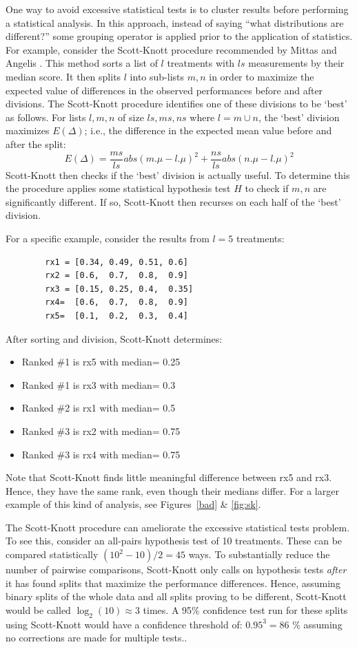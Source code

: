 \documentclass[preprint,10pt]{elsarticle}
\newcommand{\bi}{\begin{itemize}}
\newcommand{\ei}{\end{itemize}}
\begin{document}
One way to avoid excessive statistical tests is to cluster results before performing a statistical analysis. In this approach, instead of saying ``what distributions are different?'' some grouping operator is applied prior to the application of statistics.  For example, consider the   Scott-Knott procedure recommended by Mittas and Angelis \cite{mittas2013ranking}.  This method sorts a list of $l$ treatments with $\mathit{ls}$ measurements by their median score. It then splits $l$ into sub-lists $m,n$ in order to maximize the expected value of differences in the observed performances before and after divisions.  The Scott-Knott procedure identifies one of these divisions to be `best' as follows.  For lists $l,m,n$ of size $\mathit{ls},\mathit{ms},\mathit{ns}$ where $l=m\cup n$, the `best' division maximizes $E(\Delta)$; i.e., the difference in the expected mean value before and after the split: 
 \[E(\Delta)=\frac{ms}{ls}abs(m.\mu - l.\mu)^2 + \frac{ns}{ls}abs(n.\mu - l.\mu)^2\]
Scott-Knott then checks if the `best' division is actually useful. To determine this the procedure applies some statistical hypothesis test $H$ to check if $m, n$ are significantly different. If so, Scott-Knott then recurses on each half of the `best' division.
 
For a specific example, consider the results from $l=5$ treatments:

{\small 
\begin{verbatim}
        rx1 = [0.34, 0.49, 0.51, 0.6]
        rx2 = [0.6,  0.7,  0.8,  0.9]
        rx3 = [0.15, 0.25, 0.4,  0.35]
        rx4=  [0.6,  0.7,  0.8,  0.9]
        rx5=  [0.1,  0.2,  0.3,  0.4]
\end{verbatim}
}

\noindent
After sorting and division, Scott-Knott determines:
\bi
\item Ranked \#1 is rx5 with median= 0.25
\item Ranked \#1 is rx3 with median= 0.3
\item Ranked \#2 is rx1 with median= 0.5
\item Ranked \#3 is rx2 with median= 0.75
\item Ranked \#3 is rx4 with median= 0.75
\ei
Note that Scott-Knott finds little meaningful difference between rx5 and rx3. Hence, they have the same rank, even though their medians differ.  For a larger example of this kind of analysis, see Figures~\ref{bad} \& \ref{fig:sk}.

The Scott-Knott procedure can ameliorate the excessive statistical tests problem.  To see this, consider an all-pairs hypothesis test of 10 treatments. These can be compared statistically 
\mbox{$(10^2-10)/2=45$} ways.  To substantially reduce the number of pairwise comparisons, Scott-Knott only calls on hypothesis tests {\em after} it has found splits that maximize the performance differences.  Hence, assuming binary splits of the whole data and all splits proving to be different,
Scott-Knott would be called $\log_2(10)\approx 3$ times. 
A 95\% confidence test run for these splits using Scott-Knott would have a confidence threshold of: 
\mbox{$0.95^{3} = 86$} \% assuming no corrections are made for multiple tests..
 
\end{document}
